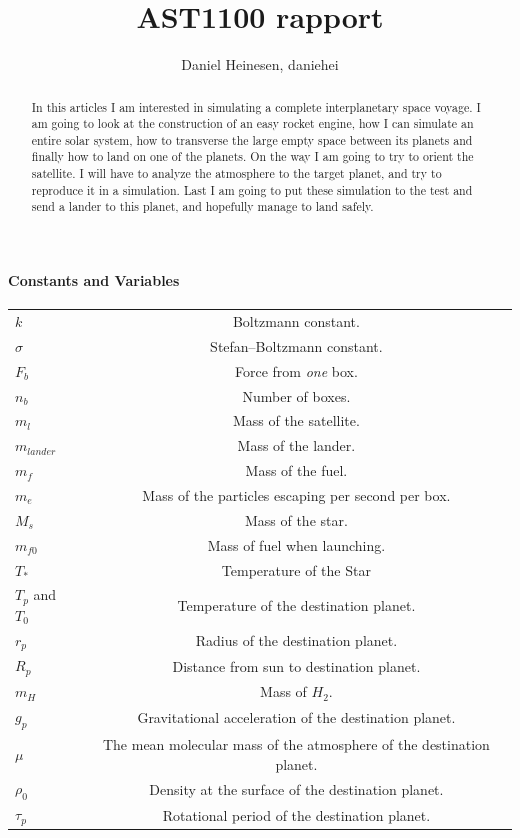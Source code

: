 \documentclass[a4paper, 10pt]{article}
\title{AST1100 rapport}
\author{Daniel Heinesen, daniehei}
\begin{document}
\maketitle

\begin{abstract}
In this articles I am interested in simulating a complete interplanetary space voyage. I am going to look at the construction of an easy rocket engine, how I can simulate an entire solar system, how to transverse the large empty space between its planets and finally how to land on one of the planets. On the way I am going to try to orient the satellite. I will have to analyze the atmosphere to the target planet, and try to reproduce it in a simulation. Last I am going to put these simulation to the test and send a lander to this planet, and hopefully manage to land safely.
\end{abstract} 

\paragraph*{Constants and Variables}

\begin{center}
\begin{tabular}{l  c}
$k$ & Boltzmann constant.\\
$\sigma$ & Stefan–Boltzmann constant.\\
$F_b$ & Force from \textit{one} box. \\
$n_b$ & Number of boxes.\\
$m_l$ & Mass of the satellite. \\
$m_{lander}$ & Mass of the lander.\\
$m_f$ & Mass of the fuel.\\
$m_e$ & Mass of the particles escaping per second per box. \\
$M_s$ & Mass of the star.\\
$m_{f0}$ & Mass of fuel when launching. \\
$T_*$ & Temperature of the Star\\
$T_p$ and $T_0$ & Temperature of the destination planet. \\
$r_p$ & Radius of the destination planet. \\
$R_p$ & Distance from sun to destination planet. \\
$m_H$ & Mass of $H_2$.\\
$g_p$ & Gravitational acceleration of the destination planet. \\
$\mu$ & The mean molecular mass of the atmosphere of the destination planet.\\
$\rho_0$ & Density at the surface of the destination planet. \\
$\tau_p$ & Rotational period of the destination planet. \\
\end{tabular}
\end{center}
\end{document}
